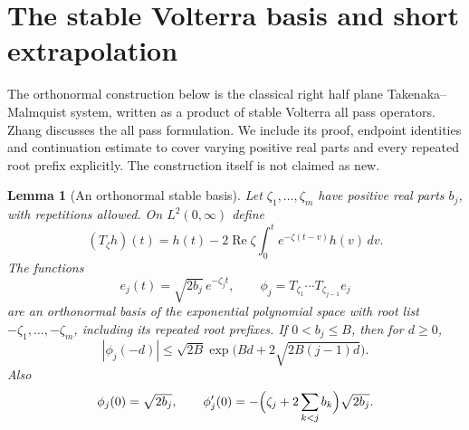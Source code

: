 \documentclass[11pt]{article}
\newtheorem{lemma}[theorem]{Lemma}
\theoremstyle{remark}
\newcommand{\Rea}{\operatorname{Re}}
\begin{document}
\section{The stable Volterra basis and short extrapolation}
The orthonormal construction below is the classical right half plane
Takenaka--Malmquist system, written as a product of stable Volterra
all pass operators. Zhang \cite[Appendix A, especially Remark A.7]{Zhang}
discusses the all pass formulation. We include its proof, endpoint
identities and continuation estimate to cover varying positive real
parts and every repeated root prefix explicitly. The construction
itself is not claimed as new.

\begin{lemma}[An orthonormal stable basis]\label{lem:basis}
Let $\zeta_1,\ldots,\zeta_m$ have positive real parts $b_j$, with
repetitions allowed. On $L^2(0,\infty)$ define
\begin{equation}\label{eq:volterra}
 (T_\zeta h)(t)=h(t)-2\Rea\zeta
                    \int_0^t e^{-\zeta(t-v)}h(v)\,dv.
\end{equation}
The functions
\begin{equation}\label{eq:basis}
 e_j(t)=\sqrt{2b_j}\,e^{-\zeta_jt},\qquad
 \phi_j=T_{\zeta_1}\cdots T_{\zeta_{j-1}}e_j
\end{equation}
are an orthonormal basis of the exponential polynomial space with root
list $-\zeta_1,\ldots,-\zeta_m$, including its repeated root prefixes.
If $0<b_j\le B$, then for $d\ge0$,
\begin{equation}\label{eq:basis-growth}
 |\phi_j(-d)|\le\sqrt{2B}
   \exp\bigl(Bd+2\sqrt{2B(j-1)d}\bigr).
\end{equation}
Also
\begin{equation}\label{eq:basis-endpoints}
 \phi_j(0)=\sqrt{2b_j},\qquad
 \phi_j'(0)=-\Bigl(\zeta_j+2\sum_{k<j}b_k\Bigr)\sqrt{2b_j}.
\end{equation}
\end{lemma}
\end{document}
